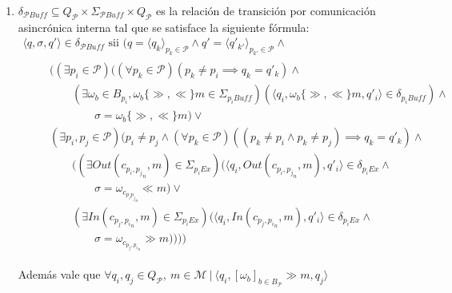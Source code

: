 \begin{definition}[Composición]
\begin{itemize}
\begin{enumerate}
\item $\delta_{\mathcal{P}\mathit{Buff}} \subseteq Q_{\mathcal{P}} \times \Sigma_{\mathcal{P} \mathit{Buff}} \times Q_{\mathcal{P}}$ es la relación de transición por comunicación asincrónica interna tal que se satisface la siguiente fórmula:
$$
\begin{array}{l}
\langle q, \sigma, q' \rangle \in \delta_{\mathcal{P}\mathit{Buff}} \mbox{ sii } (q = \langle q_k \rangle_{p_k \in \mathcal{P}} \land q' = \langle q'_{k'} \rangle_{p_{k'} \in \mathcal{P}} \land\\
\qquad
\begin{array}{l}
((\exists p_i \in \mathcal{P})((\forall p_k \in \mathcal{P})(p_k \neq p_i \implies q_k = q'_k) \land \\
\qquad(\exists \omega_b \in B_{p_i}, \omega_b \{\gg, \ll\} m \in \Sigma_{{p_i} \mathit{Buff}})(\langle q_i, \omega_b \{\gg, \ll\} m, q'_i \rangle \in \delta_{p_i \mathit{Buff}}) \land\\
\qquad\qquad \sigma = \omega_b \{\gg, \ll\} m)\lor\\
(\exists p_i, p_j \in \mathcal{P})(p_i \neq p_j \land (\forall p_k \in \mathcal{P})((p_k \neq p_i \land p_k \neq p_j) \implies q_k = q'_k) \land \\ 
\qquad ((\exists \mathit{Out}(c_{{p_i, p_j}_n}, m) \in \Sigma_{{p_i} \mathit{Ex}})(\langle q_i, \mathit{Out}(c_{{p_i, p_j}_n}, m), q'_i \rangle \in \delta_{p_i  \mathit{Ex}} \land\\
\qquad\qquad \sigma = \omega_{c_{{p_i p_j}_n}} \ll m) \lor \\ 
\qquad (\exists \mathit{In}(c_{p_j,{p_i}_n}, m) \in \Sigma_{{p_i} \mathit{Ex}})(\langle q_i, \mathit{In}(c_{p_j,{p_i}_n}, m), q'_i \rangle \in \delta_{p_i \mathit{Ex}} \land\\
\qquad\qquad \sigma = \omega_{c_{p_j,{p_i}_n}} \gg m))))
\end{array}
\end{array}
 $$
 
Además vale que $\forall q_i,q_j \in Q_\mathit{\mathcal{P}}, \ m \in \mathcal{M} \ |	 \ \langle q_i, [\omega_\mathit{b}]_{b \in B_\mathcal{P}} \gg m, q_j \rangle$


\end{enumerate}
\end{itemize}
\end{definition}
